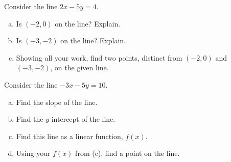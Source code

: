 \documentclass[11pt,letterpaper]{article}
\begin{document}

 Consider the line $2x - 5y= 4$.
	\begin{enumerate}[(a)]
	\item Is $(-2, 0)$ on the line? Explain.
	\item Is $(-3, -2)$ on the line? Explain.
	\item Showing all your work, find two points, distinct from $(-2, 0)$ and $(-3, -2)$, on the given line. 
	\end{enumerate}



\newpage



 Consider the line $-3x - 5y= 10$.
	\begin{enumerate}[(a)]
	\item Find the slope of the line.
	\item Find the $y$-intercept of the line.
	\item Find this line as a linear function, $f(x)$.
	\item Using your $f(x)$ from (c), find a point on the line. 
	\end{enumerate}
\end{document}
